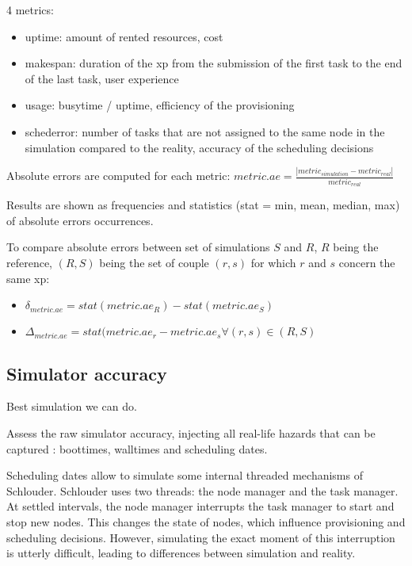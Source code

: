 \documentclass[a4paper,10pt]{article}
\begin{document}
4 metrics:
\begin{itemize}
 \item uptime: amount of rented resources, cost
 \item makespan: duration of the xp from the submission of the first task to 
the end of the last task, user experience
 \item usage: busytime / uptime, efficiency of the provisioning
 \item schederror: number of tasks that are not assigned to the same node in 
the simulation compared to the reality, accuracy of the scheduling decisions
\end{itemize}

Absolute errors are computed for each metric: $metric.ae = \frac{| metric_{simulation} 
- metric_{real} |}{metric_{real}}$

Results are shown as frequencies and statistics (stat = min, mean, median, max) of absolute errors occurrences.

To compare absolute errors between set of simulations $S$ and $R$, 
$R$ being the reference, 
$(R,S)$ being the set of couple $(r,s)$ for which $r$ and $s$ concern the same xp:
\begin{itemize}
 \item $\delta_{metric.ae} = stat(metric.ae_{R}) - stat(metric.ae_{S})$
 \item $\Delta_{metric.ae} = stat(metric.ae_{r} - metric.ae_{s} \forall (r,s) \in (R,S)$
\end{itemize}




\subsection{Simulator accuracy}

Best simulation we can do.

Assess the raw simulator accuracy, injecting all real-life hazards that can be 
captured :
boottimes, walltimes and scheduling dates.

Scheduling dates allow to simulate some internal threaded mechanisms of 
Schlouder.
Schlouder uses two threads: the node manager and the task manager.
At settled intervals, the node manager interrupts the task manager to start and 
stop new nodes.
This changes the state of nodes, which influence provisioning and scheduling 
decisions.
However, simulating the exact moment of this interruption is utterly difficult, 
leading to differences between simulation and reality.
\end{document}
